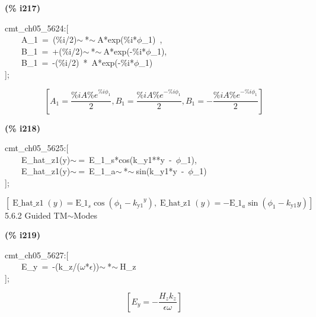\documentclass[fleqn]{article}
\begin{document}
\noindent
\begin{minipage}[t]{4.000000em}\color{red}\bfseries
(\% i217)	
\end{minipage}
\begin{minipage}[t]{\textwidth}\color{blue}
cmt\_ch05\_5624:[\\
\ \ \ \ A\_1\ =\ (\%i/2)\ensuremath{\sim\ }*\ensuremath{\sim\ }A*exp(\%i*\ensuremath{\phi}\_1)\ ,\\
\ \ \ \ B\_1\ =\ +(\%i/2)\ensuremath{\sim\ }*\ensuremath{\sim\ }A*exp(-\%i*\ensuremath{\phi}\_1),\\
\ \ \ \ B\_1\ =\ -(\%i/2)\ *\ A*exp(-\%i*\ensuremath{\phi}\_1)\\
];
\end{minipage}
\[\displaystyle \tag{\% o217} 
\left[ {A_1}=\frac{\% i A {{\% e}^{\% i {{\phi }_1}}}}{2}\operatorname{,}{B_1}=\frac{\% i A {{\% e}^{-\% i {{\phi }_1}}}}{2}\operatorname{,}{B_1}=-\frac{\% i A {{\% e}^{-\% i {{\phi }_1}}}}{2}\right] \mbox{}
\]


\noindent
\begin{minipage}[t]{4.000000em}\color{red}\bfseries
(\% i218)	
\end{minipage}
\begin{minipage}[t]{\textwidth}\color{blue}
cmt\_ch05\_5625:[\\
\ \ \ \ E\_hat\_z1(y)\ensuremath{\sim\ }=\ E\_1\_s*cos(k\_y1**y\ -\ \ensuremath{\phi}\_1),\\
\ \ \ \ E\_hat\_z1(y)\ensuremath{\sim\ }=\ E\_1\_a\ensuremath{\sim\ }*\ensuremath{\sim\ }sin(k\_y1*y\ -\ \ensuremath{\phi}\_1)\\
];
\end{minipage}
\[\displaystyle \tag{\% o218} 
\left[ \operatorname{E\_ hat\_ z1}(y)={{\ensuremath{\mathrm{E\_ 1}}}_s} \cos{\left( {{\phi }_1}-{{{k_{\ensuremath{\mathrm{y1}}}}}^{y}}\right) }\operatorname{,}\operatorname{E\_ hat\_ z1}(y)=-{{\ensuremath{\mathrm{E\_ 1}}}_a} \sin{\left( {{\phi }_1}-{k_{\ensuremath{\mathrm{y1}}}} y\right) }\right] \mbox{}
\]
5.6.2   Guided TM\ensuremath{\sim }Modes


\noindent
\begin{minipage}[t]{4.000000em}\color{red}\bfseries
(\% i219)	
\end{minipage}
\begin{minipage}[t]{\textwidth}\color{blue}
cmt\_ch05\_5627:[\\
\ \ \ \ E\_y\ =\ -(k\_z/(\ensuremath{\omega}*\ensuremath{\epsilon}))\ensuremath{\sim\ }*\ensuremath{\sim\ }H\_z\\
];
\end{minipage}
\[\displaystyle \tag{\% o219} 
\left[ {E_y}=-\frac{{H_z} {k_z}}{\epsilon  \omega }\right] \mbox{}
\]
\end{document}
